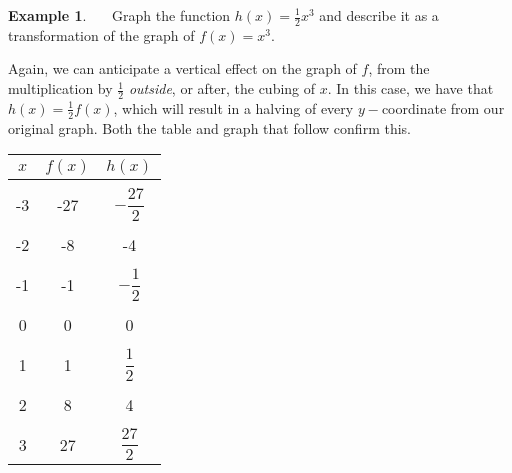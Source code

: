 \documentclass[12pt]{book}
\theoremstyle{definition}
\newtheorem{example}{Example}
\begin{document}
\begin{example}~~~Graph the function $h(x)=\frac{1}{2}x^3$ and describe it as a transformation of the graph of $f(x)=x^3$.\par
Again, we can anticipate a vertical effect on the graph of $f$, from the multiplication by $\frac{1}{2}$ {\it outside}, or after, the cubing of $x$.  In this case, we have that $h(x)=\frac{1}{2}f(x)$, which will result in a halving of every $y-$coordinate from our original graph.  Both the table and graph that follow confirm this. 
\newpage
\begin{multicols}{2}
\begin{center}
\begin{tabular}{c||c|c}
$x$ & $f(x)$ &  $h(x)$ \\
\hline
&&\\
-3 & -27 &  $-\dfrac{27}{2}$ \\
&&\\
-2 & -8 &  -4 \\
&&\\
-1 & -1 &  $-\dfrac{1}{2}$ \\
&&\\
0 & 0 &  0 \\
&&\\
1 & 1 &  $\dfrac{1}{2}$ \\
&&\\
2 & 8 &  4 \\
&&\\
3 & 27 &  $\dfrac{27}{2}$ 
\end{tabular}
\end{center}
\columnbreak
\begin{center}
\end{center}
\end{multicols}
\end{example}
\end{document}
